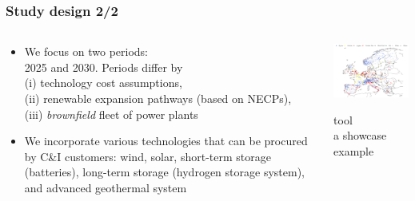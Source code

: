 \begin{frame}
  \frametitle{Study design 2/2}

\begin{columns}[T]
\begin{column}{6cm}

  \begin{itemize}

  \item We focus on two periods: \\ \alert{2025} and \alert{2030}. Periods differ by \\ 
  (i) technology cost assumptions, \\ 
  (ii) renewable expansion pathways (based on NECPs), \\(iii) \emph{brownfield} fleet of power plants
  \item We incorporate various technologies that can be procured by C\&I customers: wind, solar, short-term storage (batteries), long-term storage (hydrogen storage system), and advanced geothermal system
  \end{itemize}

\end{column}

\begin{column}{8cm}

\centering
\includegraphics[width=8cm]{images/powerplantmatching.png}

\vspace{0.1cm}
 tool \\
a showcase example
\end{column}
\end{columns}

\end{frame}


